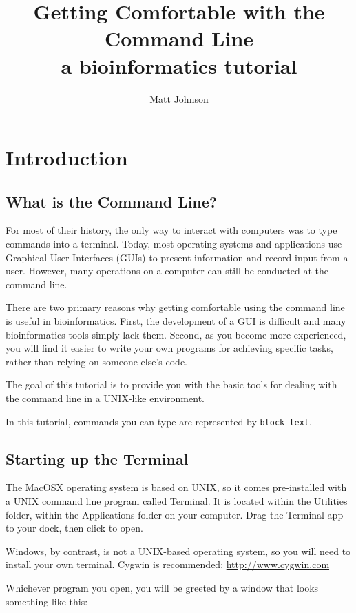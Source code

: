 \documentclass[11pt, oneside]{article}   	%
\title{Getting Comfortable with the Command Line \\ {\large a bioinformatics tutorial}}
\author{Matt Johnson}
\newcounter{terminal}
\begin{document}
\maketitle

\section{Introduction}
\subsection{What is the Command Line?}
For most of their history, the only way to interact with computers was to type commands into a terminal.
Today, most operating systems and applications use Graphical User Interfaces (GUIs) to present information and record input from a user.
However, many operations on a computer can still be conducted at the command line.

There are two primary reasons why getting comfortable using the command line is useful in bioinformatics.
First, the development of a GUI is difficult and many bioinformatics tools simply lack them.
Second, as you become more experienced, you will find it easier to write your own programs for achieving specific tasks, rather than relying on someone else's code.

The goal of this tutorial is to provide you with the basic tools for dealing with the command line in a UNIX-like environment. 

In this tutorial, commands you can type are represented by \verb+block text+.


\subsection{Starting up the Terminal}
The MacOSX operating system is based on UNIX, so it comes pre-installed with a UNIX command line program called Terminal.
It is located within the Utilities folder, within the Applications folder on your computer.
Drag the Terminal app to your dock, then click to open.

Windows, by contrast, is not a UNIX-based operating system, so you will need to install your own terminal. Cygwin is recommended: \url{http://www.cygwin.com}

Whichever program you open, you will be greeted by a window that looks something like this:

\end{document}
